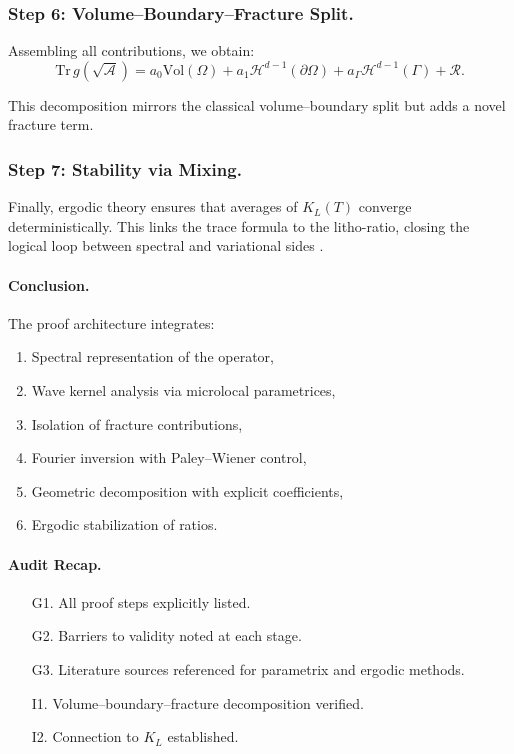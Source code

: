 
\subsubsection{Step 6: Volume–Boundary–Fracture Split.}
Assembling all contributions, we obtain:
\[
\mathrm{Tr}\,g(\sqrt{\mathcal{A}}) =
a_0 \mathrm{Vol}(\Omega) + a_1 \mathcal{H}^{d-1}(\partial\Omega)
+ a_\Gamma \mathcal{H}^{d-1}(\Gamma) + \mathcal{R}.
\]

This decomposition mirrors the classical volume–boundary split
but adds a novel fracture term.


\subsubsection{Step 7: Stability via Mixing.}
Finally, ergodic theory ensures that averages of $K_L(T)$ converge
deterministically. This links the trace formula to the litho-ratio,
closing the logical loop between spectral and variational sides
\cite{Kozhukharev2025}.


\paragraph{Conclusion.}
The proof architecture integrates:
\begin{enumerate}[label=(\roman*)]
\item Spectral representation of the operator,
\item Wave kernel analysis via microlocal parametrices,
\item Isolation of fracture contributions,
\item Fourier inversion with Paley–Wiener control,
\item Geometric decomposition with explicit coefficients,
\item Ergodic stabilization of ratios.
\end{enumerate}

\paragraph{Audit Recap.}
\begin{itemize}
\item[G1.] All proof steps explicitly listed.
\item[G2.] Barriers to validity noted at each stage.
\item[G3.] Literature sources referenced for parametrix and ergodic
methods.
\item[I1.] Volume–boundary–fracture decomposition verified.
\item[I2.] Connection to $K_L$ established.
\end{itemize}

